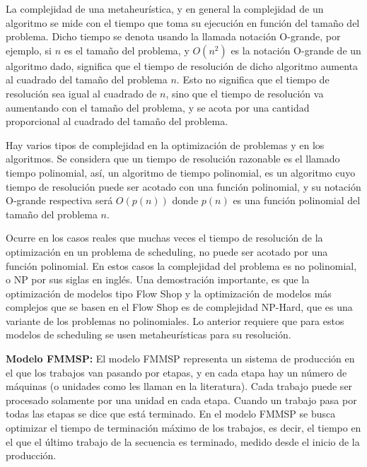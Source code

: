\documentclass{article}
\begin{document}
\vspace{\baselineskip}
La complejidad de una metaheurística, y en general la complejidad de un algoritmo se mide con el tiempo que toma su ejecución en función del tamaño del problema. Dicho tiempo se denota usando la llamada notación O-grande, por ejemplo, si $n$ es el tamaño del problema, y $O(n^2)$ es la notación O-grande de un algoritmo dado, significa que el tiempo de resolución de dicho algoritmo aumenta al cuadrado del tamaño del problema $n$. Esto no significa que el tiempo de resolución sea igual al cuadrado de $n$, sino que el tiempo de resolución va aumentando con el tamaño del problema, y se acota por una cantidad proporcional al cuadrado del tamaño del problema. \autocite{metaTalbi}

\vspace{\baselineskip}
Hay varios tipos de complejidad en la optimización de problemas y en los algoritmos. Se considera que un tiempo de resolución razonable es el llamado tiempo polinomial, así, un algoritmo de tiempo polinomial, es un algoritmo cuyo tiempo de resolución puede ser acotado con una función polinomial, y su notación O-grande respectiva será $O(p(n))$ donde $p(n)$ es una función polinomial del tamaño del problema $n$. \autocite{metaTalbi}

\vspace{\baselineskip}
Ocurre en los casos reales que muchas veces el tiempo de resolución de la optimización en un problema de scheduling, no puede ser acotado por una función polinomial. En estos casos la complejidad del problema es no polinomial, o NP por sus siglas en inglés. Una demostración importante, es que la optimización de modelos tipo Flow Shop y la optimización de modelos más complejos que se basen en el Flow Shop es de complejidad NP-Hard, que es una variante de los problemas no polinomiales. Lo anterior requiere que para estos modelos de scheduling se usen metaheurísticas para su resolución. \autocite{flowCompl}

\vspace{\baselineskip}
\textbf{Modelo FMMSP:} El modelo FMMSP representa un sistema de producción en el que los trabajos van pasando por etapas, y en cada etapa hay un número de máquinas (o unidades como les llaman en la literatura). Cada trabajo puede ser procesado solamente por una unidad en cada etapa. Cuando un trabajo pasa por todas las etapas se dice que está terminado. En el modelo FMMSP se busca optimizar el tiempo de terminación máximo de los trabajos, es decir, el tiempo en el que el último trabajo de la secuencia es terminado, medido desde el inicio de la producción. \autocite{modFMMSP}
\end{document}
